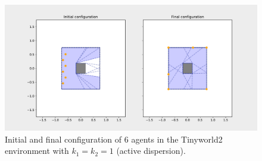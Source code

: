 \begin{figure}[H]
  \centering
  \includegraphics[width=\textwidth]{figs/tinyworld2_6_agnt_k_1_1_k_2_1_distr.pdf}
  \caption{Initial and final configuration of 6 agents in the Tinyworld2 environment with $k_{1} = k_{2} = 1$ (active dispersion).}
  \label{fig:6_agnt_tw2_k_1_1_k_2_1_distr}
\end{figure}
